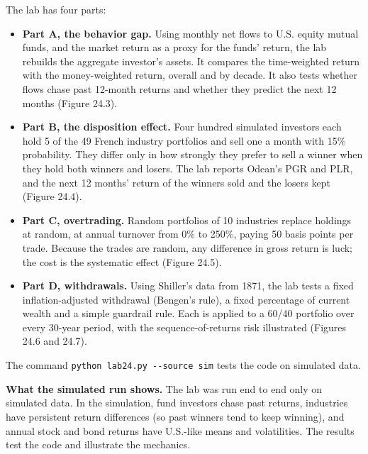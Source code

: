 The lab has four parts:

\begin{itemize}
  \item \textbf{Part A, the behavior gap.} Using monthly net flows to U.S. equity mutual funds, and the market return as a proxy for the funds' return, the lab rebuilds the aggregate investor's assets. It compares the time-weighted return with the money-weighted return, overall and by decade. It also tests whether flows chase past 12-month returns and whether they predict the next 12 months (Figure 24.3).
  \item \textbf{Part B, the disposition effect.} Four hundred simulated investors each hold 5 of the 49 French industry portfolios and sell one a month with 15\% probability. They differ only in how strongly they prefer to sell a winner when they hold both winners and losers. The lab reports Odean's PGR and PLR, and the next 12 months' return of the winners sold and the losers kept (Figure 24.4).
  \item \textbf{Part C, overtrading.} Random portfolios of 10 industries replace holdings at random, at annual turnover from 0\% to 250\%, paying 50 basis points per trade. Because the trades are random, any difference in gross return is luck; the cost is the systematic effect (Figure 24.5).
  \item \textbf{Part D, withdrawals.} Using Shiller's data from 1871, the lab tests a fixed inflation-adjusted withdrawal (Bengen's rule), a fixed percentage of current wealth and a simple guardrail rule. Each is applied to a 60/40 portfolio over every 30-year period, with the sequence-of-returns risk illustrated (Figures 24.6 and 24.7).
\end{itemize}

The command \texttt{python lab24.py -{}-source sim} tests the code on simulated data.

\textbf{What the simulated run shows.} The lab was run end to end only on simulated data. In the simulation, fund investors chase past returns, industries have persistent return differences (so past winners tend to keep winning), and annual stock and bond returns have U.S.-like means and volatilities. The results test the code and illustrate the mechanics.

